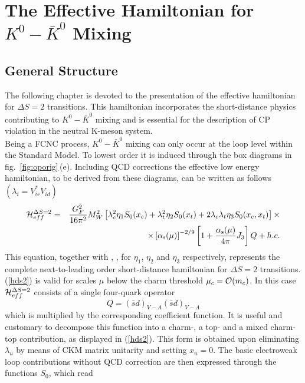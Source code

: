\section{The Effective Hamiltonian for $K^0-\bar K^0$ Mixing}
         \label{sec:HeffKKbar}

\subsection{General Structure}
\label{sec:HeffKKbar:General}
The following chapter is devoted to the presentation of the
effective hamiltonian for $\Delta S=2$ transitions. This hamiltonian
incorporates the short-distance physics contributing to
$K^0-\bar K^0$ mixing and is essential for the description of
CP violation in the neutral K-meson system.
\\
Being a FCNC process, $K^0-\bar K^0$ mixing can only occur at the
loop level within the Standard Model. To lowest order it is induced
through the box diagrams in fig.\ \ref{fig:oporig}\,(e).
Including QCD corrections the
effective low energy hamiltonian, to be derived from these diagrams,
can be written as follows $(\lambda_i = V_{is}^* V_{id}^{})$
\begin{eqnarray}\label{hds2}
{\cal H}^{\Delta S=2}_{eff}&=&\frac{G^2_F}{16\pi^2}M^2_W
 \left[\lambda^2_c\eta_1 S_0(x_c)+\lambda^2_t \eta_2 S_0(x_t)+
 2\lambda_c\lambda_t \eta_3 S_0(x_c, x_t)\right] \times
\nonumber\\
& & \times \left[\alpha_{\rm s}(\mu)\right]^{-2/9}\left[
  1 + \frac{\alpha_{\rm s}(\mu)}{4\pi} J_3\right]  Q + h. c.
\end{eqnarray}
This equation, together with , , 
for $\eta_1$, $\eta_2$ and $\eta_3$ respectively, represents the
complete next-to-leading order short-distance hamiltonian for
$\Delta S=2$ transitions. (\ref{hds2}) is valid for scales $\mu$
below the charm threshold $\mu_c={\cal O}(m_c)$. In this case
${\cal H}^{\Delta S=2}_{eff}$ consists of a single four-quark operator
\begin{equation}\label{qsdsd}
Q=(\bar sd)_{V-A}(\bar sd)_{V-A}
\end{equation}
which is multiplied by the corresponding coefficient function.
It is useful and customary to decompose this function into a
charm-, a top- and a mixed charm-top contribution, as displayed
in (\ref{hds2}). This form is obtained upon eliminating $\lambda_u$
by means of CKM matrix unitarity and setting $x_u=0$. The basic
electroweak loop contributions without QCD correction are then
expressed through the functions $S_0$, which read \cite{inamilim:81}
